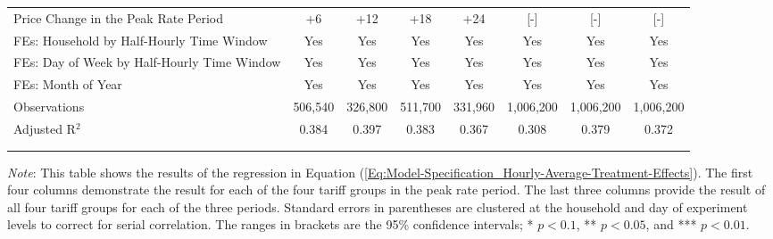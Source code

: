 \begin{table}[h!]
\begin{adjustbox}{scale = 0.75}
\begin{threeparttable}
\begin{tabular}{@{\extracolsep{3pt}}lccccccc}
                    Price Change in the Peak Rate Period & +6 & +12 & +18 & +24 & [-] & [-] & [-] \\
                    FEs: Household by Half-Hourly Time Window & Yes & Yes & Yes & Yes & Yes & Yes & Yes \\
                    FEs: Day of Week by Half-Hourly Time Window & Yes & Yes & Yes & Yes & Yes & Yes & Yes \\
                    FEs: Month of Year & Yes & Yes & Yes & Yes & Yes & Yes & Yes \\
                    Observations & 506,540 & 326,800 & 511,700 & 331,960 & 1,006,200 & 1,006,200 & 1,006,200 \\
                    Adjusted R$^{2}$ & 0.384 & 0.397 & 0.383 & 0.367 & 0.308 & 0.379 & 0.372 \\
                    \\[-2.0ex]
                    \hline \hline
                    \\[-4.5ex]
                \end{tabular}
                \begin{tablenotes}[flushleft]
                    \footnotesize
                    \item \textit{Note}: This table shows the results of the regression in Equation (\ref{Eq:Model-Specification_Hourly-Average-Treatment-Effects}). The first four columns demonstrate the result for each of the four tariff groups in the peak rate period. The last three columns provide the result of all four tariff groups for each of the three periods. Standard errors in parentheses are clustered at the household and day of experiment levels to correct for serial correlation. The ranges in brackets are the 95\% confidence intervals; * $p < 0.1$, ** $p < 0.05$, and *** $p < 0.01$.
                \end{tablenotes}
            \end{threeparttable}
        \end{adjustbox}
    \end{table}
